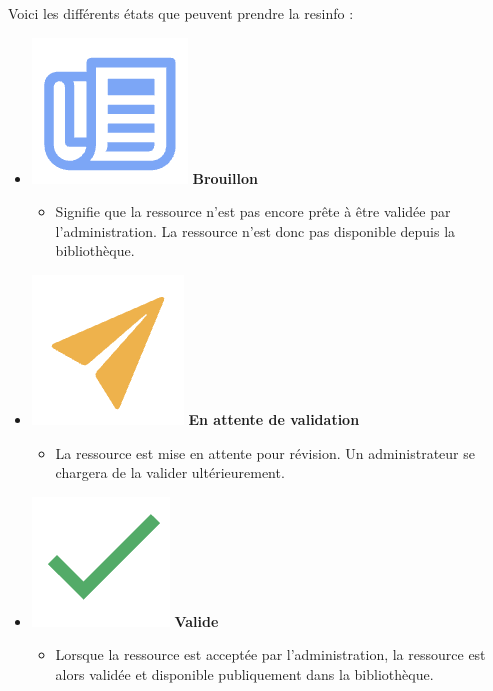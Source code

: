 
Voici les différents états que peuvent prendre la \gls{resinfo} :

\begin{itemize}
    \item \includegraphics[scale=0.3]{images/client/draft.png} \textbf{Brouillon}
    \begin{itemize}
        \item Signifie que la ressource n'est pas encore prête à être validée par l'administration. La ressource n'est donc pas disponible depuis la bibliothèque.
    \end{itemize}
    \item \includegraphics[scale=0.3]{images/client/pending.png} \textbf{En attente de validation}
    \begin{itemize}
        \item La ressource est mise en attente pour révision. Un administrateur se chargera de la valider ultérieurement.
    \end{itemize}
    \item \includegraphics[scale=0.3]{images/client/validated.png} \textbf{Valide}
    \begin{itemize}
        \item Lorsque la ressource est acceptée par l'administration, la ressource est alors validée et disponible publiquement dans la bibliothèque.

\end{itemize}
\end{itemize}
